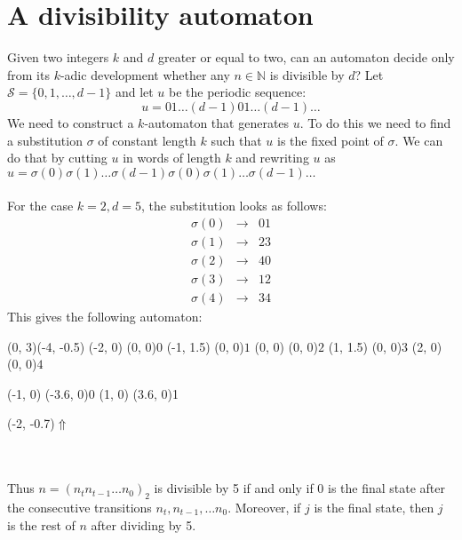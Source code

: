 \documentclass{article}
\begin{document}
\section*{A divisibility automaton}
Given two integers $k$ and $d$ greater or equal to two, can an automaton 
decide only from its $k$-adic development whether any $n \in \mathbb{N}$ is
divisible by $d$? Let $\mathcal{S} = \{0, 1, \ldots, d - 1\}$ and let $u$ be the
periodic sequence:
\begin{displaymath}
  u = 01\ldots(d - 1)01\ldots(d - 1)\ldots
\end{displaymath}
We need to construct a $k$-automaton that generates $u$. To do this we need to
find a substitution $\sigma$ of constant length $k$ such that $u$ is the fixed
point of $\sigma$. We can do that by cutting $u$ in words of length $k$ and
rewriting $u$ as
$u = \sigma(0)\sigma(1)\ldots\sigma(d - 1)\sigma(0)\sigma(1)\ldots\sigma(d - 1)\ldots$\\
\\
For the case $k = 2, d = 5$, the substitution looks as follows:\\
\vbox{\begin{eqnarray*}
  \sigma(0) &\to& 01\\
  \sigma(1) &\to& 23\\
  \sigma(2) &\to& 40\\
  \sigma(3) &\to& 12\\
  \sigma(4) &\to& 34
\end{eqnarray*}}
This gives the following automaton:\\
\begin{graph}(0, 3)(-4, -0.5)
  (-2, 0) (0, 0){$0$}
  (-1, 1.5) (0, 0){$1$}
  (0, 0) (0, 0){$2$}
  (1, 1.5) (0, 0){$3$}
  (2, 0) (0, 0){$4$}

  (-1, 0) \freetext(-3.6, 0){0}
   
   
   
   
   
   
   
   
  (1, 0) \freetext(3.6, 0){1}

  \freetext(-2, -0.7){$\Uparrow$}
\end{graph}\\
\\
Thus $n = (n_t n_{t - 1} \ldots n_0)_2$ is divisible by 5 if and only if 0 is
the final state after the consecutive transitions $n_t, n_{t - 1}, \ldots n_0$.
Moreover, if $j$ is the final state, then $j$ is the rest of $n$ after dividing
by 5.
\end{document}
